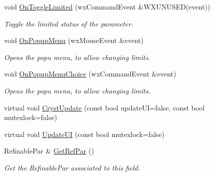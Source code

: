 \begin{DoxyCompactItemize}
void \mbox{\hyperlink{class_obj_cryst_1_1_w_x_field_ref_par_a9629d247dbfb8cf94f42b069753c7cf7}{On\+Toggle\+Limited}} (wx\+Command\+Event \&W\+X\+U\+N\+U\+S\+ED(event))
\begin{DoxyCompactList}\small\item\em Toggle the \textquotesingle{}limited\textquotesingle{} status of the parameter. \end{DoxyCompactList}\item 
\mbox{\label{class_obj_cryst_1_1_w_x_field_ref_par_a4d0a81de88c127d17542f83305865d59}} 
void \mbox{\hyperlink{class_obj_cryst_1_1_w_x_field_ref_par_a4d0a81de88c127d17542f83305865d59}{On\+Popup\+Menu}} (wx\+Mouse\+Event \&event)
\begin{DoxyCompactList}\small\item\em Opens the popu menu, to allow changing limits. \end{DoxyCompactList}\item 
\mbox{\label{class_obj_cryst_1_1_w_x_field_ref_par_a64690fe762aa6c7a4da9fb4bdc5b2096}} 
void \mbox{\hyperlink{class_obj_cryst_1_1_w_x_field_ref_par_a64690fe762aa6c7a4da9fb4bdc5b2096}{On\+Popup\+Menu\+Choice}} (wx\+Command\+Event \&event)
\begin{DoxyCompactList}\small\item\em Opens the popu menu, to allow changing limits. \end{DoxyCompactList}\item 
virtual void \mbox{\hyperlink{class_obj_cryst_1_1_w_x_field_ref_par_a91bdc3391485b7376466af6046a62df7}{Cryst\+Update}} (const bool update\+UI=false, const bool mutexlock=false)
\item 
virtual void \mbox{\hyperlink{class_obj_cryst_1_1_w_x_field_ref_par_aa11b53ed79e160ec1201c5743aef80ca}{Update\+UI}} (const bool mutexlock=false)
\item 
\mbox{\label{class_obj_cryst_1_1_w_x_field_ref_par_a36aa41fce1d42fbb04736a0cfe7a028f}} 
Refinable\+Par \& \mbox{\hyperlink{class_obj_cryst_1_1_w_x_field_ref_par_a36aa41fce1d42fbb04736a0cfe7a028f}{Get\+Ref\+Par}} ()
\begin{DoxyCompactList}\small\item\em Get the Refinable\+Par associated to this field. \end{DoxyCompactList}\item 

\end{DoxyCompactItemize}
